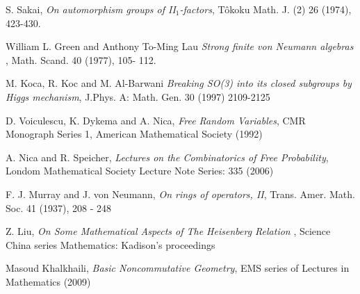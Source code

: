 \documentclass{amsart}
\begin{document}
\begin{thebibliography}{21}
 S. Sakai, {\em On automorphism groups of II$_1$-factors}, T\^{o}koku Math. J. (2) 26 (1974), 423-430.

 William L. Green and Anthony To-Ming Lau {\em Strong finite von Neumann algebras }, Math. Scand. 40 (1977), 105- 112.

 M. Koca, R. Koc and M. Al-Barwani {\em Breaking SO(3) into its closed subgroups by Higgs mechanism}, J.Phys. A: Math. Gen. 30 (1997) 2109-2125

 D. Voiculescu, K. Dykema and A. Nica, {\em Free Random Variables}, CMR Monograph Series 1, American Mathematical Society (1992)

 A. Nica and R. Speicher, {\em Lectures on the Combinatorics of Free Probability}, Londom Mathematical Society Lecture Note Series: 335 (2006)

 F. J. Murray and J. von Neumann, {\em On rings of operators, II}, Trans. Amer. Math. Soc. 41 (1937), 208 - 248

 Z. Liu, {\em On Some Mathematical Aspects of The Heisenberg Relation }, Science China series Mathematics: Kadison's proceedings

 Masoud Khalkhaili, {\em Basic Noncommutative Geometry}, EMS series of Lectures in Mathematics (2009)

\end{thebibliography}
\end{document}
